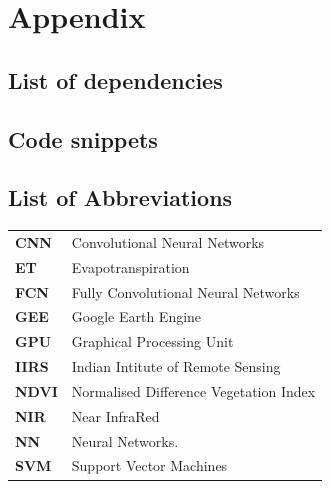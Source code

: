 \documentclass[12pt, a4paper]{report}
\begin{document}

\chapter*{Appendix}

\section*{List of dependencies}

\section*{Code snippets}

\printbibliography[heading=bibintoc, title={References}]

\setcounter{secnumdepth}{0}
\section*{List of Abbreviations}
\vspace*{0.5cm}
\begin{tabular}{p{} p{}}
\textbf{CNN} & Convolutional Neural Networks\\
\textbf{ET} & Evapotranspiration\\
\textbf{FCN} & Fully Convolutional Neural Networks\\
\textbf{GEE} & Google Earth Engine\\
\textbf{GPU} & Graphical Processing Unit\\
\textbf{IIRS} & Indian Intitute of Remote Sensing\\
\textbf{NDVI} & Normalised Difference Vegetation Index\\
\textbf{NIR} & Near InfraRed\\
\textbf{NN} & Neural Networks.\\
\textbf{SVM} & Support Vector Machines\\
\end{tabular}
\vspace*{1cm}

\end{document}
